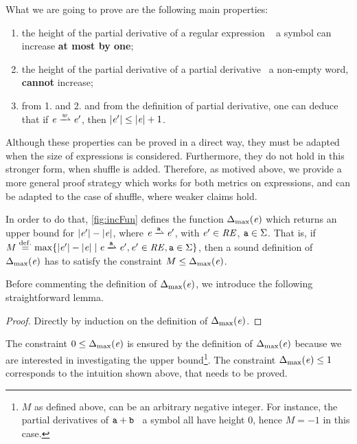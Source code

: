 What we are going to prove are the following main properties:
\begin{enumerate}
 \item the height of the partial derivative of a regular expression \wrt~ a symbol can increase \textbf{at most by one};
 \item the height of the partial derivative of a partial derivative \wrt~a non-empty word, \textbf{cannot} increase;
 \item from 1. and 2. and from the definition of partial derivative, one can deduce that if $\re\parDer{\word}\re'$, then ${\mid}{\mathit {e}'}{\mid}\leq{\mid}{\ensuremath{\mathit {e}}}{\mid}+1$.
\end{enumerate}
Although these properties can be proved in a direct way, they must be adapted when the size of expressions is considered.
Furthermore, they do not hold in this stronger form, when shuffle is added. Therefore, as motived above, we provide a more general proof strategy which works for both metrics on expressions, and can be adapted to the case of shuffle, where weaker claims hold.

In order to do that, \cref{fig:incFun} defines the function ${\Delta_{\max}}({\mathit {e}})$ which returns an upper bound for ${\mid}{\mathit {e}'}{\mid}-{\mid}{\mathit {e}}{\mid}$, where
$\re\parDer{\sym}\re'$, with $\mathit {e}'\in\mathit {RE}$, $\mathtt {a}\in\Sigma$.
That is, if $M\stackrel{\mathrm{def.}}{=}\max\{\theight{\re'}-\theight{\re} \mid \re\parDer{\sym}\re', \re'\in\reSet, \sym\in\symAlph\}$, then
a sound definition of ${\Delta_{\max}}({\mathit {e}})$ has to satisfy the constraint $M\leq{\Delta_{\max}}({\mathit {e}})$.

Before commenting the definition of ${\Delta_{\max}}({\mathit {e}})$, we introduce the following straightforward lemma.
\begin{proof}
 Directly by induction on the definition of ${\Delta_{\max}}({\mathit {e}})$.
\end{proof}

The constraint $0\leq{\Delta_{\max}}({\mathit {e}})$ is ensured by the definition of ${\Delta_{\max}}({\mathit {e}})$ because we are interested in investigating the upper bound\footnote{$M$ as defined above, can be an arbitrary negative integer. For instance, the partial derivatives of $\mathtt {a}\mathbin{+}\mathtt {b}$ \wrt~a symbol all have height 0, hence $M=-1$ in this case.}. The constraint ${\Delta_{\max}}({\mathit {e}})\leq 1$ corresponds to the intuition shown above, that needs to be proved.

